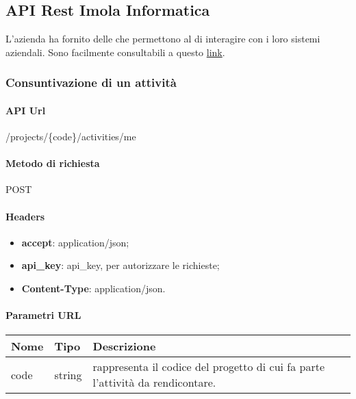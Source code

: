 \subsection{API Rest Imola Informatica} L'azienda ha fornito delle  che permettono al  di interagire con i loro sistemi aziendali. Sono facilmente consultabili a questo \href{https://apibot4me.imolinfo.it/}{\color{blue} link}.
\subsubsection{Consuntivazione di un attività}
\paragraph{API Url} \hfill \break
/projects/\{code\}/activities/me
\paragraph{Metodo di richiesta } \hfill \break
POST
\paragraph{Headers }
\begin{itemize}
    \item \textbf{accept}: application/json;
    \item \textbf{api\_key}: api\_key, per autorizzare le richieste;
    \item \textbf{Content-Type}: application/json.
\end{itemize}
\paragraph{Parametri URL} \hfill \break
\begin{center}
    \renewcommand{\arraystretch}{1.8}
    \begin{tabular}{ |m{10em}|m{4em}|m{20em}| }
        \hline
        \textbf{Nome} & \textbf{Tipo} & \textbf{Descrizione} \\
        \hline
        code & string & rappresenta il codice del progetto di cui fa parte l’attività da rendicontare.\\
        \hline
    \end{tabular}
\end{center}
